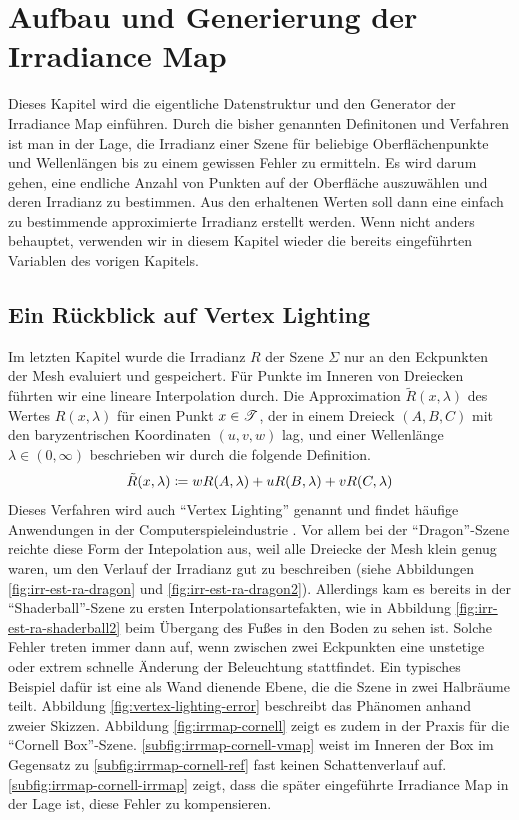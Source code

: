 \section{Aufbau und Generierung der Irradiance Map} %
\label{sec:aufbau_und_generierung_der_irradiance_map}

	Dieses Kapitel wird die eigentliche Datenstruktur und den Generator der Irradiance Map einführen.
	Durch die bisher genannten Definitonen und Verfahren ist man in der Lage, die Irradianz einer Szene für beliebige Oberflächenpunkte und Wellenlängen bis zu einem gewissen Fehler zu ermitteln.
	Es wird darum gehen, eine endliche Anzahl von Punkten auf der Oberfläche auszuwählen und deren Irradianz zu bestimmen.
	Aus den erhaltenen Werten soll dann eine einfach zu bestimmende approximierte Irradianz erstellt werden.
	Wenn nicht anders behauptet, verwenden wir in diesem Kapitel wieder die bereits eingeführten Variablen des vorigen Kapitels.

	\subsection{Ein Rückblick auf Vertex Lighting} %
	\label{sub:rückblick_auf_vertex_lighting}

		Im letzten Kapitel wurde die Irradianz $R$ der Szene $\Sigma$ nur an den Eckpunkten der Mesh evaluiert und gespeichert.
		Für Punkte im Inneren von Dreiecken führten wir eine lineare Interpolation durch.
		Die Approximation $\tilde{R}(x,\lambda)$ des Wertes $R(x,\lambda)$ für einen Punkt $x\in\mathscr{T}$, der in einem Dreieck $(A,B,C)$ mit den baryzentrischen Koordinaten $(u,v,w)$ lag, und einer Wellenlänge $\lambda\in (0,\infty)$ beschrieben wir durch die folgende Definition.
		\[
			\tilde{R}(x,\lambda) \coloneqq w R(A,\lambda) + u R(B,\lambda) + v R(C,\lambda)
		\]
		Dieses Verfahren wird auch \enquote{Vertex Lighting} genannt und findet häufige Anwendungen in der Computerspieleindustrie \cite{tricks-game}.
		Vor allem bei der \enquote{Dragon}-Szene reichte diese Form der Intepolation aus, weil alle Dreiecke der Mesh klein genug waren, um den Verlauf der Irradianz gut zu beschreiben (siehe Abbildungen \ref{fig:irr-est-ra-dragon} und \ref{fig:irr-est-ra-dragon2}).
		Allerdings kam es bereits in der \enquote{Shaderball}-Szene zu ersten Interpolationsartefakten, wie in Abbildung \ref{fig:irr-est-ra-shaderball2} beim Übergang des Fußes in den Boden zu sehen ist.
		Solche Fehler treten immer dann auf, wenn zwischen zwei Eckpunkten eine unstetige oder extrem schnelle Änderung der Beleuchtung stattfindet.
		Ein typisches Beispiel dafür ist eine als Wand dienende Ebene, die die Szene in zwei Halbräume teilt.
		Abbildung \ref{fig:vertex-lighting-error} beschreibt das Phänomen anhand zweier Skizzen.
		Abbildung \ref{fig:irrmap-cornell} zeigt es zudem in der Praxis für die \enquote{Cornell Box}-Szene.
		\ref{subfig:irrmap-cornell-vmap} weist im Inneren der Box im Gegensatz zu \ref{subfig:irrmap-cornell-ref} fast keinen Schattenverlauf auf.
		\ref{subfig:irrmap-cornell-irrmap} zeigt, dass die später eingeführte Irradiance Map in der Lage ist, diese Fehler zu kompensieren.

